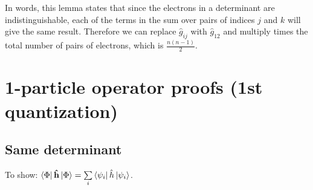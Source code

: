 \documentclass{article}
\newcommand{\suml}{\sum\limits}
\newcommand{\boldh}{\ensuremath{\mathbf{\hat{h}}}}
\begin{document}
In words, this lemma states that since the electrons in a determinant are indistinguishable, each of the terms in the sum over pairs of indices $j$ and $k$ will give the same result. Therefore we can replace $\hat{g}_{ij}$ with $\hat{g}_{12}$ and multiply times the total number of pairs of electrons, which is $\frac{n(n-1)}{2}$.
\newpage



\section{1-particle operator proofs (1st quantization)}

\subsection{Same determinant}
To show: $\bra{\Phi}\boldh \ket{\Phi} = \suml_i \bra{\psi_i} \hat{h}\ket{\psi_i}$.
\end{document}
